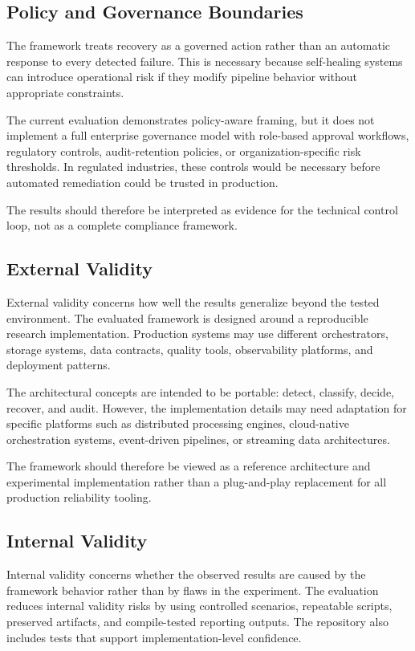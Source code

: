 \subsection{Policy and Governance Boundaries}

The framework treats recovery as a governed action rather than an automatic response to every detected failure. This is necessary because self-healing systems can introduce operational risk if they modify pipeline behavior without appropriate constraints.

The current evaluation demonstrates policy-aware framing, but it does not implement a full enterprise governance model with role-based approval workflows, regulatory controls, audit-retention policies, or organization-specific risk thresholds. In regulated industries, these controls would be necessary before automated remediation could be trusted in production.

The results should therefore be interpreted as evidence for the technical control loop, not as a complete compliance framework.

\subsection{External Validity}

External validity concerns how well the results generalize beyond the tested environment. The evaluated framework is designed around a reproducible research implementation. Production systems may use different orchestrators, storage systems, data contracts, quality tools, observability platforms, and deployment patterns.

The architectural concepts are intended to be portable: detect, classify, decide, recover, and audit. However, the implementation details may need adaptation for specific platforms such as distributed processing engines, cloud-native orchestration systems, event-driven pipelines, or streaming data architectures.

The framework should therefore be viewed as a reference architecture and experimental implementation rather than a plug-and-play replacement for all production reliability tooling.

\subsection{Internal Validity}

Internal validity concerns whether the observed results are caused by the framework behavior rather than by flaws in the experiment. The evaluation reduces internal validity risks by using controlled scenarios, repeatable scripts, preserved artifacts, and compile-tested reporting outputs. The repository also includes tests that support implementation-level confidence.

